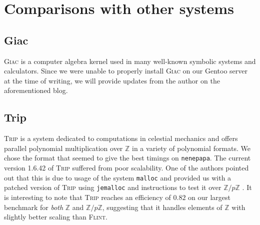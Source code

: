 \documentclass{deliverablereport}
\begin{document}
\section{Comparisons with other systems}
\subsection{Giac}
\textsc{Giac} \cite{Giac} is a computer algebra kernel used in many well-known symbolic systems and calculators. Since we were unable to properly install \textsc{Giac} on our Gentoo server at the time of writing, we will provide updates from the author on the aforementioned blog.

\subsection{Trip}
\textsc{Trip} \cite{Gastineau:2011:TCA:1940475.1940518} is a system dedicated to computations in celestial mechanics and offers parallel polynomial multiplication over $\mathbb{Z}$ in a variety of polynomial formats. We chose the format that seemed to give the best timings on {\tt nenepapa}. The current version 1.6.42 of \textsc{Trip} suffered from poor scalability. One of the authors pointed out that this is due to usage of the system {\tt malloc} and provided us with a patched version of \textsc{Trip} using {\tt jemalloc} and instructions to test it over $\mathbb{Z}/p\mathbb{Z}$ . It is interesting to note that \textsc{Trip} reaches an efficiency of $0.82$ on our largest benchmark for \emph{both} $\mathbb{Z}$ and $\mathbb{Z}/p\mathbb{Z}$, suggesting that it handles elements of $\mathbb{Z}$ with slightly better scaling than \textsc{Flint}.
\end{document}
